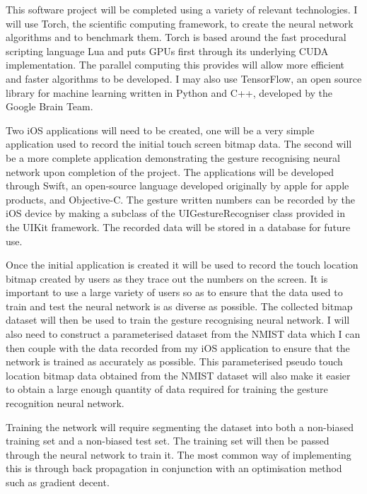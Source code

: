 \documentclass[]{weekly-report}
\begin{document}
This software project will be completed using a variety of relevant technologies. I will use Torch, the scientific computing framework, to create the neural network algorithms and to benchmark them. Torch is based around the fast procedural scripting language Lua and puts GPUs first through its underlying CUDA implementation. The parallel computing this provides will allow more efficient and faster algorithms to be developed. I may also use TensorFlow, an open source library for machine learning written in Python and C++, developed by the Google Brain Team.

Two iOS applications will need to be created, one will be a very simple application used to record the initial touch screen bitmap data. The second will be a more complete application demonstrating the gesture recognising neural network upon completion of the project. The applications will be developed through Swift, an open-source language developed originally by apple for apple products, and Objective-C. The gesture written numbers can be recorded by the iOS device by making a subclass of the UIGestureRecogniser class provided in the UIKit framework. The recorded data will be stored in a database for future use.

Once the initial application is created it will be used to record the touch location bitmap created by users as they trace out the numbers on the screen. It is important to use a large variety of users so as to ensure that the data used to train and test the neural network is as diverse as possible. The collected bitmap dataset will then be used to train the gesture recognising neural network. I will also need to construct a parameterised dataset from the NMIST data which I can then couple with the data recorded from my iOS application to ensure that the network is trained as accurately as possible. This parameterised pseudo touch location bitmap data obtained from the NMIST dataset will also make it easier to obtain a large enough quantity of data required for training the gesture recognition neural network.

Training the network will require segmenting the dataset into both a non-biased training set and a non-biased test set. The training set will then be passed through the neural network to train it. The most common way of implementing this is through back propagation in conjunction with an optimisation method such as gradient decent.
\end{document}
